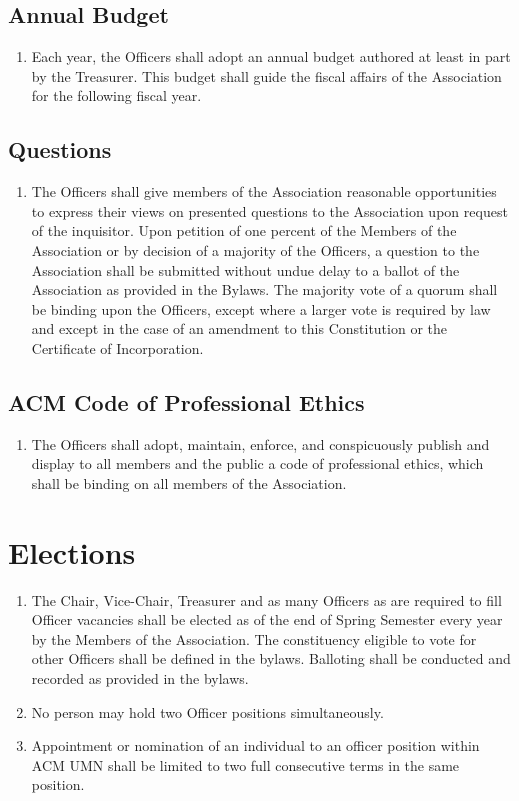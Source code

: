 \subsection{Annual Budget}
\begin{enumerate}
	\item Each year, the Officers shall adopt an annual budget authored at least in part by the Treasurer. This budget shall guide the fiscal affairs of the Association for the following fiscal year.
\end{enumerate}

\subsection{Questions}
\begin{enumerate}
	\item The Officers shall give members of the Association reasonable opportunities to express their views on presented questions to the Association upon request of the inquisitor. Upon petition of one percent of the Members of the Association or by decision of a majority of the Officers, a question to the Association shall be submitted without undue delay to a ballot of the Association as provided in the Bylaws. The majority vote of a quorum shall be binding upon the Officers, except where a larger vote is required by law and except in the case of an amendment to this Constitution or the Certificate of Incorporation.
\end{enumerate}

\subsection{ACM Code of Professional Ethics}
\begin{enumerate}
	\item The Officers shall adopt, maintain, enforce, and conspicuously publish and display to all members and the public a code of professional ethics, which shall be binding on all members of the Association.
\end{enumerate}

\section{Elections}
\begin{enumerate}
	\item The Chair, Vice-Chair, Treasurer and as many Officers as are required to fill Officer vacancies shall be elected as of the end of Spring Semester every year by the Members of the Association. The constituency eligible to vote for other Officers shall be defined in the bylaws. Balloting shall be conducted and recorded as provided in the bylaws.
	\item No person may hold two Officer positions simultaneously.
	\item Appointment or nomination of an individual to an officer position within ACM UMN shall be limited to two full consecutive terms in the same position.
\end{enumerate}

